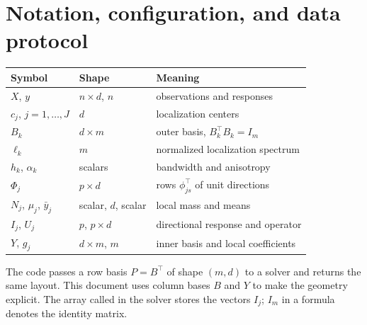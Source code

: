\documentclass[11pt,a4paper]{article}
\newcommand{\code}[1]{\texttt{\detokenize{#1}}}
\begin{document}
\section{Notation, configuration, and data protocol}\label{sec:notation}
\begin{center}
\begin{tabular}{lll}
\toprule
Symbol & Shape & Meaning\\
\midrule
$X$, $y$ & $n\times d$, $n$ & observations and responses\\
$c_j$, $j=1,\ldots,J$ & $d$ & localization centers\\
$B_k$ & $d\times m$ & outer basis, $B_k^\top B_k=I_m$\\
$\ell_k$ & $m$ & normalized localization spectrum\\
$h_k$, $\alpha_k$ & scalars & bandwidth and anisotropy\\
$\Phi_j$ & $p\times d$ & rows $\phi_{js}^\top$ of unit directions\\
$N_j$, $\mu_j$, $\bar y_j$ & scalar, $d$, scalar & local mass and means\\
$I_j$, $U_j$ & $p$, $p\times d$ & directional response and operator\\
$Y$, $g_j$ & $d\times m$, $m$ & inner basis and local coefficients\\
\bottomrule
\end{tabular}
\end{center}
The code passes a row basis $P=B^\top$ of shape $(m,d)$ to a solver and
returns the same layout. This document uses column bases $B$ and $Y$ to
make the geometry explicit. The array called \code{I} in the solver stores
the vectors $I_j$; $I_m$ in a formula denotes the identity matrix.
\end{document}
